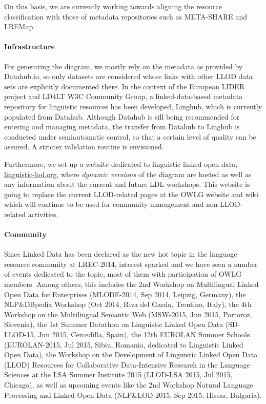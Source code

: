 On this basis, we are currently working towards aligning the resource classification with those of metadata repositories such as META-SHARE and LREMap.

\paragraph{Infrastructure}
For generating the diagram, we mostly rely on the metadata as provided by Datahub.io, so only datasets are considered whose links with other LLOD data sets are explicitly documented there.
In the context of the European LIDER project and LD4LT W3C Community Group, a linked-data-based metadata repository for linguistic resources has been developed, Linghub, which is currently populated from Datahub. 
Although Datahub is sill being recommended for entering and managing metadata, the transfer from Datahub to Linghub is conducted under semiautomatic control, so that a certain level of quality can be assured. A stricter validation routine is envisioned. %

Furthermore, we set up a website dedicated to linguistic linked open data, \url{linguistic-lod.org}, where \emph{dynamic versions} of the diagram are hosted as well as any information about the current and future LDL workshops. This website is going to replace the current LLOD-related pages at the OWLG website and wiki which will continue to be used for community management and non-LLOD-related activities.

\paragraph{Community}
Since Linked Data has been declared as the new hot topic in the language resource community at LREC-2014, interest sparked and we have seen a number of events dedicated to the topic, most of them with participation of OWLG members. 
Among others, this includes 
the 2nd Workshop on Multilingual Linked Open Data for Enterprises (MLODE-2014, Sep 2014, Leipzig, Germany), 
the NLP\&DBpedia Workshop (Oct 2014, Riva del Garda, Trentino, Italy), 
the 4th Workshop on the Multilingual Semantic Web (MSW-2015, Jun 2015, Portoroz, Slovenia),
the 1st Summer Datathon on Linguistic Linked Open Data (SD-LLOD-15, Jun 2015, Cercedilla, Spain), 
the 12th EUROLAN Summer Schools (EUROLAN-2015, Jul 2015, Sibiu, Romania, dedicated to Linguistic Linked Open Data),
the Workshop on the Development of Linguistic Linked Open Data (LLOD) Resources for Collaborative Data-Intensive Research in the Language Sciences at the LSA Summer Institute 2015 (LLOD-LSA 2015, Jul 2015, Chicago),
as well as upcoming events like 
the 2nd Workshop Natural Language Processing and Linked Open Data (NLP\&LOD-2015, Sep 2015, Hissar, Bulgaria). 

